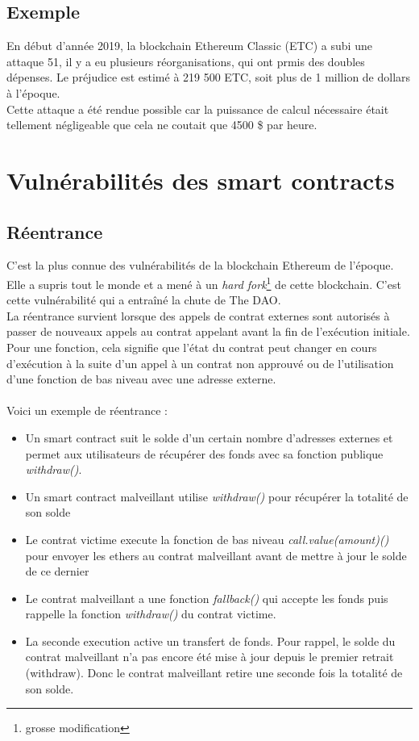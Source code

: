 \documentclass[12pt, a4paper, oneside]{book}
\begin{document}
    \subsection{Exemple}
    En début d'année 2019, la blockchain Ethereum Classic (ETC) a subi une attaque 51, il y a eu plusieurs réorganisations, qui ont prmis des doubles dépenses. Le préjudice est estimé à 219 500 ETC, soit plus de 1 million de dollars à l'époque.
    \\
    Cette attaque a été rendue possible car la puissance de calcul nécessaire était tellement négligeable que cela ne coutait que 4500 \$ par heure.\cite{51ETC}

    \section[Vulnérabilités des smart contracts]{Vulnérabilités des smart contracts~\cite{dasp}}
    \subsection{Réentrance}

    C'est la plus connue des vulnérabilités de la blockchain Ethereum de l'époque. Elle a supris tout le monde et a mené à un \emph{hard fork}\footnote{grosse modification} de cette blockchain. C'est cette vulnérabilité qui a entraîné la chute de The DAO.
    \\
    La réentrance survient lorsque des appels de contrat externes sont autorisés à passer de nouveaux appels au contrat appelant avant la fin de l'exécution initiale. Pour une fonction, cela signifie que l'état du contrat peut changer en cours d'exécution à la suite d'un appel à un contrat non approuvé ou de l'utilisation d'une fonction de bas niveau avec une adresse externe.
    \\
    \\
    Voici un exemple de réentrance :
    \begin{itemize}
        \item Un smart contract suit le solde d'un certain nombre d'adresses externes et permet aux utilisateurs de récupérer des fonds avec sa fonction publique \emph{withdraw()}.
        \item Un smart contract malveillant utilise \emph{withdraw()} pour récupérer la totalité de son solde
        \item Le contrat victime execute la fonction de bas niveau \emph{call.value(amount)()} pour envoyer les ethers au contrat malveillant avant de mettre à jour le solde de ce dernier
        \item Le contrat malveillant a une fonction \emph{fallback()} qui accepte les fonds puis rappelle la fonction \emph{withdraw()} du contrat victime.
        \item La seconde execution active un transfert de fonds. Pour rappel, le solde du contrat malveillant n'a pas encore été mise à jour depuis le premier retrait (withdraw). Donc le contrat malveillant retire une seconde fois la totalité de son solde.
    \end{itemize}
\end{document}
